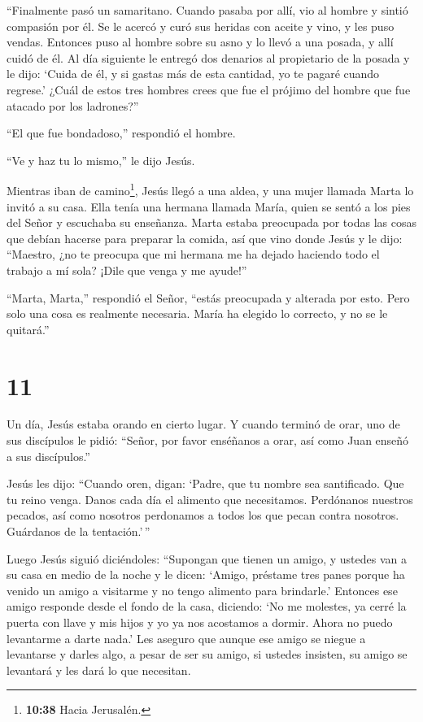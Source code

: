  ``Finalmente pasó un samaritano. Cuando pasaba por allí,
vio al hombre y sintió compasión por él.  Se le acercó y
curó sus heridas con aceite y vino, y les puso vendas. Entonces puso al
hombre sobre su asno y lo llevó a una posada, y allí cuidó de él.
 Al día siguiente le entregó dos denarios al propietario de
la posada y le dijo: `Cuida de él, y si gastas más de esta cantidad, yo
te pagaré cuando regrese.'  ¿Cuál de estos tres hombres
crees que fue el prójimo del hombre que fue atacado por los ladrones?''

 ``El que fue bondadoso,'' respondió el hombre.

``Ve y haz tu lo mismo,'' le dijo Jesús.

 Mientras iban de camino\footnote{\textbf{10:38} Hacia
  Jerusalén.}, Jesús llegó a una aldea, y una mujer llamada Marta lo
invitó a su casa.  Ella tenía una hermana llamada María,
quien se sentó a los pies del Señor y escuchaba su enseñanza.
 Marta estaba preocupada por todas las cosas que debían
hacerse para preparar la comida, así que vino donde Jesús y le dijo:
``Maestro, ¿no te preocupa que mi hermana me ha dejado haciendo todo el
trabajo a mí sola? ¡Dile que venga y me ayude!''

 ``Marta, Marta,'' respondió el Señor, ``estás preocupada y
alterada por esto.  Pero solo una cosa es realmente
necesaria. María ha elegido lo correcto, y no se le quitará.''

\hypertarget{section-10}{%
\section{11}\label{section-10}}

 Un día, Jesús estaba orando en cierto lugar. Y cuando
terminó de orar, uno de sus discípulos le pidió: ``Señor, por favor
enséñanos a orar, así como Juan enseñó a sus discípulos.''

 Jesús les dijo: ``Cuando oren, digan: `Padre, que tu nombre
sea santificado. Que tu reino venga.  Danos cada día el
alimento que necesitamos.  Perdónanos nuestros pecados, así
como nosotros perdonamos a todos los que pecan contra nosotros.
Guárdanos de la tentación.'\,''

 Luego Jesús siguió diciéndoles: ``Supongan que tienen un
amigo, y ustedes van a su casa en medio de la noche y le dicen: `Amigo,
préstame tres panes  porque ha venido un amigo a visitarme y
no tengo alimento para brindarle.'  Entonces ese amigo
responde desde el fondo de la casa, diciendo: `No me molestes, ya cerré
la puerta con llave y mis hijos y yo ya nos acostamos a dormir. Ahora no
puedo levantarme a darte nada.'  Les aseguro que aunque ese
amigo se niegue a levantarse y darles algo, a pesar de ser su amigo, si
ustedes insisten, su amigo se levantará y les dará lo que necesitan.

